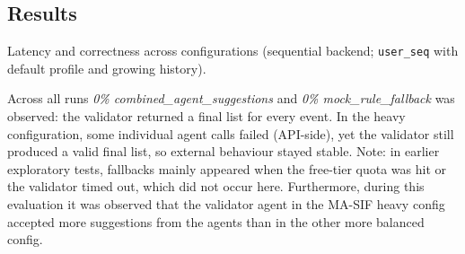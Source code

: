\documentclass[openany]{book}
\begin{document}
\subsection*{Results}
\begin{table}[h]
\centering
\caption{Latency and correctness across configurations (sequential backend; \texttt{user\_seq} with default profile and growing history).}
\setlength{\tabcolsep}{4pt}
\small
{}
\caption*{\textit{Legend.} WS p50/p90/max: WebSocket round-trip latency percentiles and maximum (ms). Suite p50/p90/max: end-to-end latency percentiles and maximum for the deterministic event suite (ms). Schema-valid: share of responses that passed JSON schema validation (\%). \textit{n}: number of events.}
\end{table}

Across all runs \emph{0\% combined\_agent\_suggestions} and \emph{0\% mock\_rule\_fallback} was observed: the validator returned a final list for every event. In the heavy configuration, some individual agent calls failed (API-side), yet the validator still produced a valid final list, so external behaviour stayed stable.  
Note: in earlier exploratory tests, fallbacks mainly appeared when the free-tier quota was hit or the validator timed out, which did not occur here. Furthermore, during this evaluation it was observed that the validator agent in the MA-SIF heavy config accepted more suggestions from the agents than in the other more balanced config.
\end{document}

